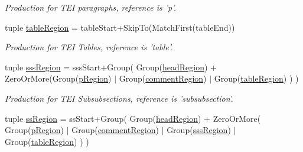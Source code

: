 \begin{DoxyCompactItemize}
\begin{DoxyCompactList}\small\item\em Production for T\-E\-I paragraphs, reference is 'p'. \end{DoxyCompactList}\item 
\hypertarget{classxutools_1_1parsers_1_1_t_e_i_lite_parser_afc2d597c1b62047d38c167ce77d1c080}{tuple \hyperlink{classxutools_1_1parsers_1_1_t_e_i_lite_parser_afc2d597c1b62047d38c167ce77d1c080}{table\-Region} = table\-Start+Skip\-To(Match\-First(table\-End))}\label{classxutools_1_1parsers_1_1_t_e_i_lite_parser_afc2d597c1b62047d38c167ce77d1c080}

\begin{DoxyCompactList}\small\item\em Production for T\-E\-I Tables, reference is 'table'. \end{DoxyCompactList}\item 
\hypertarget{classxutools_1_1parsers_1_1_t_e_i_lite_parser_addadf6fc1e854051cd613347055cbbbe}{tuple \hyperlink{classxutools_1_1parsers_1_1_t_e_i_lite_parser_addadf6fc1e854051cd613347055cbbbe}{sss\-Region} = sss\-Start+Group( Group(\hyperlink{classxutools_1_1parsers_1_1_t_e_i_lite_parser_a518d5701e5eaec79a72507a5b4670bd8}{head\-Region}) + Zero\-Or\-More(Group(\hyperlink{classxutools_1_1parsers_1_1_t_e_i_lite_parser_ac55a5952c3487b4509af1903cbe50a3e}{p\-Region}) $|$ Group(\hyperlink{classxutools_1_1parsers_1_1_t_e_i_lite_parser_ada58e2826fd1460fce2c76bba59afb81}{comment\-Region}) $|$ Group(\hyperlink{classxutools_1_1parsers_1_1_t_e_i_lite_parser_afc2d597c1b62047d38c167ce77d1c080}{table\-Region}) ) )}\label{classxutools_1_1parsers_1_1_t_e_i_lite_parser_addadf6fc1e854051cd613347055cbbbe}

\begin{DoxyCompactList}\small\item\em Production for T\-E\-I Subsubsections, reference is 'subsubsection'. \end{DoxyCompactList}\item 
\hypertarget{classxutools_1_1parsers_1_1_t_e_i_lite_parser_a1ac66c21c7e527ec0100ae062a21e469}{tuple \hyperlink{classxutools_1_1parsers_1_1_t_e_i_lite_parser_a1ac66c21c7e527ec0100ae062a21e469}{ss\-Region} = ss\-Start+Group( Group(\hyperlink{classxutools_1_1parsers_1_1_t_e_i_lite_parser_a518d5701e5eaec79a72507a5b4670bd8}{head\-Region}) + Zero\-Or\-More( Group(\hyperlink{classxutools_1_1parsers_1_1_t_e_i_lite_parser_ac55a5952c3487b4509af1903cbe50a3e}{p\-Region}) $|$ Group(\hyperlink{classxutools_1_1parsers_1_1_t_e_i_lite_parser_ada58e2826fd1460fce2c76bba59afb81}{comment\-Region}) $|$ Group(\hyperlink{classxutools_1_1parsers_1_1_t_e_i_lite_parser_addadf6fc1e854051cd613347055cbbbe}{sss\-Region}) $|$ Group(\hyperlink{classxutools_1_1parsers_1_1_t_e_i_lite_parser_afc2d597c1b62047d38c167ce77d1c080}{table\-Region}) ) )}\label{classxutools_1_1parsers_1_1_t_e_i_lite_parser_a1ac66c21c7e527ec0100ae062a21e469}


\end{DoxyCompactItemize}
